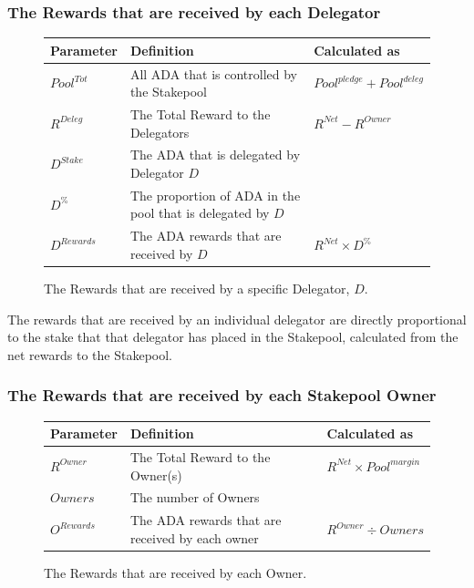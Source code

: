 \documentclass[11pt,a4paper,dvipsnames,twosided,final]{article}
\newcommand{\ada}{ADA{}}
\begin{document}
\subsubsection*{The Rewards that are received by each Delegator}

\begin{figure}[h!]
\begin{center}
\begin{tabular}{||l|p{6cm}|l||}
  \hline \hline
\textbf{Parameter} & \textbf{Definition} & \textbf{Calculated as} \\\hline
${\textit{Pool}}^{Tot}$ & All \ada{} that is controlled by the Stakepool & ${\textit{Pool}}^\textit{pledge} + {\textit{Pool}}^\textit{deleg}$ \\\hline
$R^{Deleg}$ & The Total Reward to the Delegators & $R^{\textit{Net}} - R^\textit{Owner}$ \\\hline
$D^{Stake}$ & The \ada{} that is delegated by Delegator $D$ & \\\hline
$D^\%$ & The proportion of \ada{} in the pool that is delegated by $D$ & \\\hline
$D^{Rewards}$ & The \ada{} rewards that are received by $D$ & $R^{\textit{Net}} \times D^\%$ \\\hline
\hline
\end{tabular}
\end{center}
\caption{The Rewards that are received by a specific Delegator, $D$.}
\end{figure}

\noindent
The rewards that are received by an individual delegator are directly proportional to the
stake that that delegator has placed in the Stakepool, calculated from the net rewards to the
Stakepool.

\subsubsection*{The Rewards that are received by each Stakepool Owner}

\begin{figure}[h!]
\begin{center}
\begin{tabular}{||l|p{6cm}|l||}
  \hline \hline
\textbf{Parameter}  & \textbf{Definition} & \textbf{Calculated as} \\\hline
$R^\textit{Owner}$ & The Total Reward to the Owner(s) & $R^{\textit{Net}} \times {\textit{Pool}}^{\textit{margin}} $ \\\hline
$\textit{Owners}$ & The number of Owners & \\\hline
$O^{Rewards}$ & The \ada{} rewards that are received by each owner & $R^\textit{Owner} \div \textit{Owners}$ \\\hline
\hline
\end{tabular}
\end{center}
\caption{The Rewards that are received by each Owner.}
\end{figure}
\end{document}

